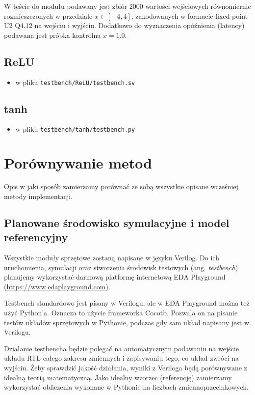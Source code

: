 \documentclass[12pt, a4paper, oneside]{scrreprt}
\begin{document}
W teście do modułu podawany jest zbiór $2000$ wartości wejściowych równomiernie
rozmieszczonych w przedziale $x \in [-4,4]$, zakodowanych w formacie fixed-point
U2 Q4.12 na wejściu i wyjściu. Dodatkowo do wyznaczenia opóźnienia (latency) podawana
jest próbka kontrolna $x=1.0$.

\section{ReLU}

\begin{itemize}
    \item w pliku \texttt{testbench/ReLU/testbench.sv}
\end{itemize}

\section{tanh}

\begin{itemize}
    \item w pliku \texttt{testbench/tanh/testbench.py}
\end{itemize}


\chapter{Porównywanie metod}

Opis w jaki sposób zamierzamy porównać ze sobą wszystkie opisane wcześniej metody implementacji.

\section{Planowane środowisko symulacyjne i model referencyjny}
Wszystkie moduły sprzętowe zostaną napisane w języku Verilog. Do ich uruchomienia, symulacji oraz stworzenia środowisk testowych (ang. \textit{testbench}) planujemy wykorzystać darmową platformę internetową EDA Playground (\url{https://www.edaplayground.com}). 

Testbench standardowo jest pisany w Verilogu, ale w EDA Playground można też użyć 
Python'a. Oznacza to użycie frameworka Cocotb. Pozwala on na pisanie testów układów
sprzętowych w Pythonie, podczas gdy sam układ napisany jest w Verilogu.

Działanie testbencha będzie polegać na automatycznym podawaniu na wejście układu RTL całego zakresu zmiennych i zapisywaniu tego, co układ zwróci na wyjściu. Żeby sprawdzić jakość działania, wyniki z Veriloga będą porównywane z idealną teorią matematyczną.
Jako idealny wzorzec (referencję) zamierzamy wykorzystać obliczenia wykonane w Pythonie na liczbach zmiennoprzecinkowych.
\end{document}
